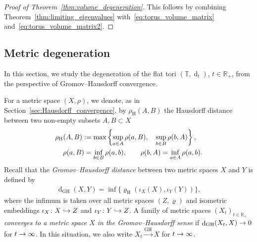 \documentclass[AHL,Unicode,longabstracts]{cedram}
\DeclareMathOperator{\dist}{d}
\newcommand{\R}{\mathbb{R}}
\newcommand{\T}{\mathbb{T}}
\newcommand{\GH}{\mathrm{GH}}
\newcommand{\HA}{\mathrm{H}}
\renewcommand*{\to}{\mathchoice{\longrightarrow}{\rightarrow}{\rightarrow}{\rightarrow}}
\newcommand{\longhookrightarrow}{\lhook\joinrel\longrightarrow}
\newcommand*{\hookto}{\mathchoice{\longhookrightarrow}{\hookrightarrow}{\hookrightarrow}{\hookrightarrow}}
\newcommand*{\Mk}{\mkern -2mu}
\newcommand*{\MK}{\mkern 2mu}
\begin{document}
\begin{proof}[Proof of Theorem~\ref{thm:volume_degeneration}]
This follows by combining Theorem~\ref{thm:limiting_eigenvalues} with~\eqref{eq:torus_volume_matrix} and~\eqref{eq:torus_volume_matrix2}.
\end{proof}

\subsection{Metric degeneration} 

In this section, we study the degeneration of the flat tori $(\T, \dist_t)$, $t \in \R_+$, from the perspective of Gromov--Hausdorff convergence.

For a metric space $(X,\rho)$, we denote, as in Section~\ref{sec:Hausdorff_convergence}, by $\rho_{\HA}(A,B)$ the Hausdorff distance between two non-empty subsets $A, B \subset X$
\begin{align*}
\rho_{\HA}(A,B) \,\MK &\!\Mk:= \max \left\{ \sup_{a \in A} \rho(a, B), \quad \sup_{b \in B} \rho(b, A) \right\},\\ \rho(a,B) &= \inf_{b \in B}\rho(a,b), \qquad\rho(b,A) = \inf_{a \in A}\rho(a,b).
\end{align*}
Recall that the \emph{Gromov--Hausdorff distance} between two metric spaces $X$ and $Y$ is defined by
\begin{align*}
\dist_{\GH}(X,Y) = 
\inf \{\varrho_{\HA}(\iota_X(X), \iota_Y(Y))\},
\end{align*}
where the infimum is taken over all metric spaces $(Z,\varrho)$ and isometric embeddings $\iota_X \colon X \hookto Z$ and $\iota_Y \colon Y \hookto Z$. A family of metric spaces $(X_t)_{t \in \R_+}$ \emph{converges to a metric space $X$ in the Gromov--Hausdorff sense} if $\dist_{\GH}(X_t,X) \to 0$ for $t \to \infty$. In this situation, we also write $X_t \xrightarrow{\GH} X$ for $t \to \infty$.
\end{document}
